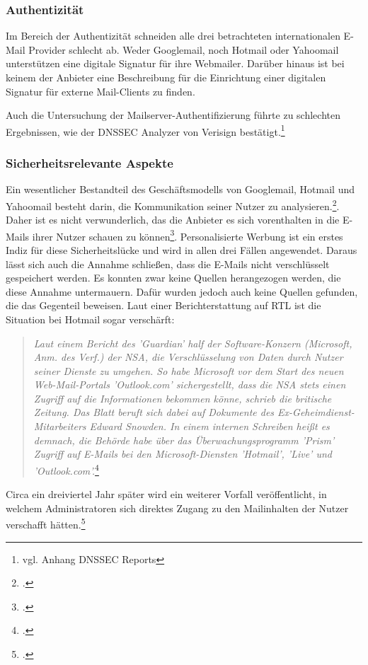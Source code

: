 \documentclass  [paper=a4,
				fontsize=12pt,
				listof=totoc,
				bibliography=totoc
				]{scrreprt}
\begin{document}
			
			\subsubsection{Authentizität}
			Im Bereich der Authentizität schneiden alle drei betrachteten internationalen E-Mail Provider schlecht ab.
			Weder Googlemail, noch Hotmail oder Yahoomail unterstützen eine digitale Signatur für ihre Webmailer. Darüber hinaus ist bei keinem der Anbieter eine Beschreibung für die Einrichtung einer digitalen Signatur für externe Mail-Clients zu finden. 
			\medskip
			
			Auch die Untersuchung der Mailserver-Authentifizierung führte zu schlechten Ergebnissen, wie der \ac{DNSSEC} Analyzer von Verisign bestätigt.\footnote{vgl. Anhang DNSSEC Reports} 
		
		
			\subsubsection{Sicherheitsrelevante Aspekte}
			Ein wesentlicher Bestandteil des Geschäftsmodells von Googlemail, Hotmail und Yahoomail besteht darin, die Kommunikation seiner Nutzer zu analysieren.\footcite[Vgl.][]{Kirsch}. Daher ist es nicht verwunderlich, das die Anbieter es sich vorenthalten in die E-Mails ihrer Nutzer schauen zu können\footcite[Vgl.][]{Schwan}. Personalisierte Werbung ist ein erstes Indiz für diese Sicherheitslücke und wird in allen drei Fällen angewendet. Daraus lässt sich auch die Annahme schließen, dass die E-Mails nicht verschlüsselt gespeichert werden. Es konnten zwar keine Quellen herangezogen werden, die diese Annahme untermauern. Dafür wurden jedoch auch keine Quellen gefunden, die das Gegenteil beweisen.
			Laut einer Berichterstattung auf RTL ist die Situation bei Hotmail sogar verschärft:
			\begin{quote}

			\textit{ Laut einem Bericht des 'Guardian' half der Software-Konzern (Microsoft, Anm. des Verf.) der NSA, die Verschlüsselung von Daten durch Nutzer seiner Dienste zu umgehen. So habe Microsoft vor dem Start des neuen Web-Mail-Portals 'Outlook.com' sichergestellt, dass die NSA stets einen Zugriff auf die Informationen bekommen könne, schrieb die britische Zeitung. Das Blatt beruft sich dabei auf Dokumente des Ex-Geheimdienst- Mitarbeiters Edward Snowden. In einem internen Schreiben heißt es demnach, die Behörde habe über das Überwachungsprogramm 'Prism' Zugriff auf E-Mails bei den Microsoft-Diensten 'Hotmail', 'Live' und 'Outlook.com'.}\footcite[Vgl.][]{Guardian}
			\end{quote}  
			Circa ein dreiviertel Jahr später wird ein weiterer Vorfall veröffentlicht, in welchem Administratoren sich direktes Zugang zu den Mailinhalten der Nutzer verschafft hätten.\footcite[Vgl.][]{Mailbox2014Microsoft}
			\medskip
			
\end{document}
